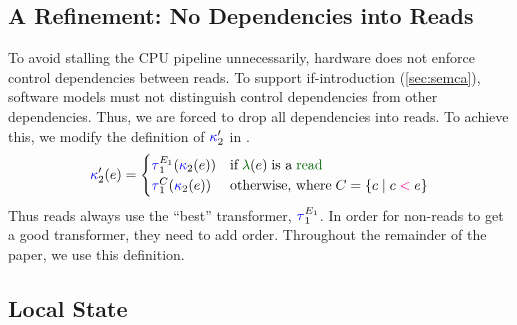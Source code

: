 \subsection{A Refinement: No Dependencies into Reads}
\label{sec:read-read}

To avoid stalling the CPU pipeline unnecessarily, hardware does not
enforce control dependencies between reads.  To support if-introduction
(\textsection\ref{sec:semca}), software models must not distinguish control
dependencies from other dependencies.  Thus, we are forced to drop all
dependencies into reads.  To achieve this, we modify the definition of
${\color{blue}\kappa}'_2$ in .
\begin{displaymath}
  \labelingForm'_2(\aEv)=
  \begin{cases}
    \aTrAbbrv[1]{\aEvs_1}{\labelingForm_2(\aEv)} & \text{if}\; \labeling(\aEv) \;\text{is a}\sread
    \\
    \aTr[1]{\Cdown{\aEv}}{\labelingForm_2(\aEv)} & \text{otherwise, where}\; \Cdown{\aEv}=\{ \cEv \mid \cEv \lt \aEv \}
  \end{cases}
\end{displaymath}
Thus reads always use the ``best'' transformer, $\aTrAbbrv[1]{\aEvs_1}{}$.  In order for
non-reads to get a good transformer, they need to add order.
Throughout the remainder of the paper, we use this definition.


\subsection{Local State}
\label{sec:lir}
\label{sec:q}

